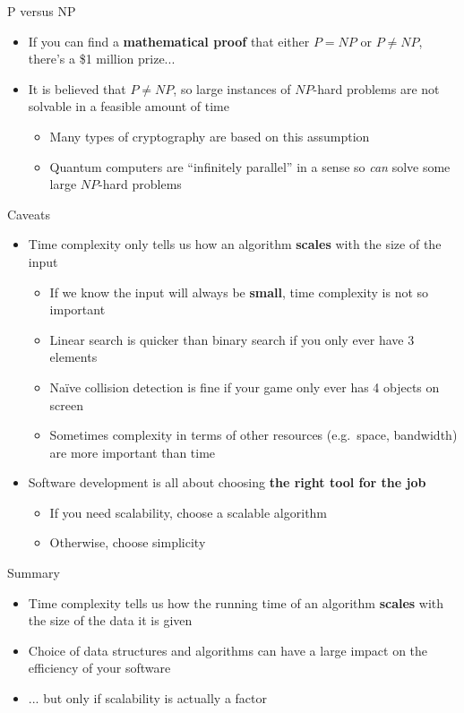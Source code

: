 \begin{frame}{P versus NP}
	\begin{itemize}
		\pause\item If you can find a \textbf{mathematical proof} that either $P = NP$ or $P \neq NP$, there's a \$1 million prize...
		\pause\item It is believed that $P \neq NP$, so large instances of
			$NP$-hard problems are not solvable in a feasible amount of time
			\begin{itemize}
				\pause\item Many types of cryptography are based on this assumption
				\pause\item Quantum computers are ``infinitely parallel'' in a sense
					so \emph{can} solve some large $NP$-hard problems
			\end{itemize}
	\end{itemize}
\end{frame}

\begin{frame}{Caveats}
	\begin{itemize}
		\item Time complexity only tells us how an algorithm \textbf{scales} with the size of the input \pause
			\begin{itemize}
				\item If we know the input will always be \textbf{small}, time complexity is not so important \pause
				\item Linear search is quicker than binary search if you only ever have 3 elements \pause
				\item Na\"ive collision detection is fine if your game only ever has 4 objects on screen \pause
				\item Sometimes complexity in terms of other resources (e.g.\ space, bandwidth) are more important than time \pause
			\end{itemize}
		\item Software development is all about choosing \textbf{the right tool for the job} \pause
			\begin{itemize}
				\item If you need scalability, choose a scalable algorithm \pause
				\item Otherwise, choose simplicity
			\end{itemize}
	\end{itemize}
\end{frame}

\begin{frame}{Summary}
	\begin{itemize}
		\item Time complexity tells us how the running time of an algorithm \textbf{scales} with the size of the data
			it is given \pause
		\item Choice of data structures and algorithms can have a large impact on the efficiency of your software \pause
		\item ... but only if scalability is actually a factor
	\end{itemize}
\end{frame}
